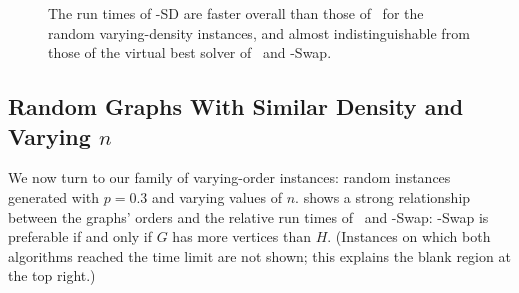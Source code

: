 \begin{figure}[h!]
    \centering
    \caption{The run times of \McSplit-SD are faster overall than those of \McSplit\ for the
        random varying-density instances, and almost indistinguishable from those of the virtual
        best solver of \McSplit\ and \McSplit-Swap.}
        \label{figure:left-vs-smart-d-mcis}
\end{figure}

\subsection{Random Graphs With Similar Density and Varying $n$}

We now turn to our family of varying-order instances: random instances
generated with $p=0.3$ and varying values of $n$.
 shows a strong relationship between the graphs'
orders and the relative run times of \McSplit\ and \McSplit-Swap: 
\McSplit-Swap
is preferable if and only if $G$ has more vertices than $H$.  (Instances on which both
algorithms reached the time limit are not shown; this explains the blank region
at the top right.)

